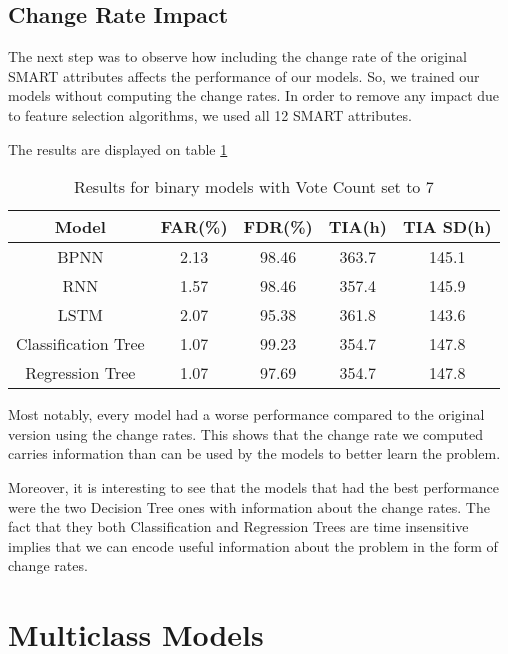 \subsection{Change Rate Impact}\label{subsec:change_rate_impact}

The next step was to observe how including the change rate of the original SMART attributes affects the performance of our models.
So, we trained our models without computing the change rates.
In order to remove any impact due to feature selection algorithms, we used all 12 SMART attributes.

The results are displayed on table \ref{table:results_binary_no_change_rate}

\begin{table}
  \begin{center}
    \begin{tabular}{|c|c|c|c|c|}
      \hline
    Model & FAR(\%) & FDR(\%) & TIA(h) & TIA SD(h) \\
    \hline
    BPNN & 2.13 & 98.46 & 363.7 & 145.1 \\
    RNN & 1.57 & 98.46 & 357.4 & 145.9 \\
    LSTM & 2.07 & 95.38 & 361.8 & 143.6 \\
    Classification Tree & 1.07 & 99.23 & 354.7 & 147.8 \\
    Regression Tree & 1.07 & 97.69 & 354.7 & 147.8 \\
    \hline
    \end{tabular}
    \caption[Results Binary Models with Voting]{Results for binary models with Vote Count set to 7}
    \label{table:results_binary_no_change_rate}
  \end{center}
\end{table}

Most notably, every model had a worse performance compared to the original version using the change rates.
This shows that the change rate we computed carries information than can be used by the models to better learn the problem.

Moreover, it is interesting to see that the models that had the best performance were the two Decision Tree ones with information about the change rates.
The fact that they both Classification and Regression Trees are time insensitive implies that we can encode useful information about the problem in the form of change rates. 

\section{Multiclass Models}

